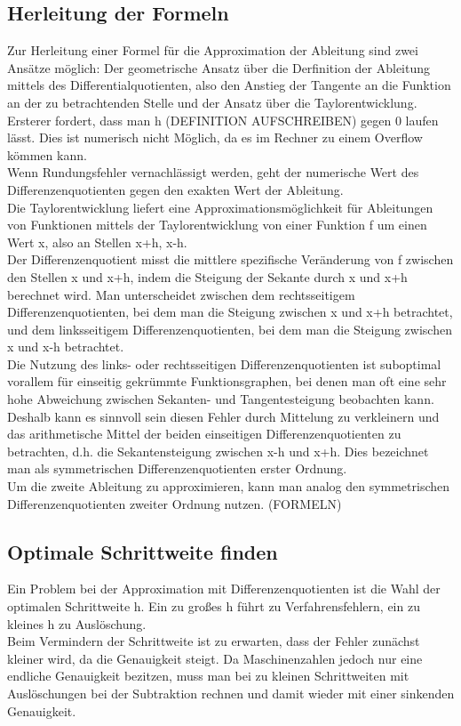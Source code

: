 \documentclass{scrartcl}
\begin{document}
\subsection{Herleitung der Formeln}
\label{ssec:herleitung}
Zur Herleitung einer Formel für die Approximation der Ableitung sind zwei Ansätze möglich: Der geometrische Ansatz über die Derfinition der Ableitung mittels des Differentialquotienten, also den Anstieg der Tangente an die Funktion an der zu betrachtenden Stelle und der Ansatz über die Taylorentwicklung. Ersterer fordert, dass man h (DEFINITION AUFSCHREIBEN) gegen 0 laufen lässt. Dies ist numerisch nicht Möglich, da es im Rechner zu einem Overflow kömmen kann.\\
Wenn Rundungsfehler vernachlässigt werden, geht der numerische Wert des Differenzenquotienten gegen den exakten Wert der Ableitung. \\
Die Taylorentwicklung liefert eine Approximationsmöglichkeit für Ableitungen von Funktionen mittels der Taylorentwicklung von einer Funktion f um einen Wert x, also an Stellen x+h, x-h.\\
Der Differenzenquotient misst die mittlere spezifische Veränderung von f zwischen den Stellen x und x+h, indem die Steigung der Sekante durch x und x+h berechnet wird. Man unterscheidet zwischen dem rechtsseitigem Differenzenquotienten, bei dem man die Steigung zwischen x und x+h betrachtet, und dem linksseitigem Differenzenquotienten, bei dem man die Steigung zwischen x und x-h betrachtet.\\
Die Nutzung des links- oder rechtsseitigen Differenzenquotienten ist suboptimal vorallem für einseitig gekrümmte Funktionsgraphen, bei denen man oft eine sehr hohe Abweichung zwischen Sekanten- und Tangentesteigung beobachten kann. Deshalb kann es sinnvoll sein diesen Fehler durch Mittelung zu verkleinern und das arithmetische Mittel der beiden einseitigen Differenzenquotienten zu betrachten, d.h. die Sekantensteigung zwischen x-h und x+h. Dies bezeichnet man als symmetrischen Differenzenquotienten erster Ordnung.\\
Um die zweite Ableitung zu approximieren, kann man analog den symmetrischen Differenzenquotienten zweiter Ordnung nutzen. (FORMELN)\\

\subsection{Optimale Schrittweite finden}
\label{ssec:schrittweite}
Ein Problem bei der Approximation mit Differenzenquotienten ist die Wahl der optimalen Schrittweite h. Ein zu großes h führt zu Verfahrensfehlern, ein zu kleines h zu Auslöschung.\\
Beim Vermindern der Schrittweite ist zu erwarten, dass der Fehler zunächst kleiner wird, da die Genauigkeit steigt. Da Maschinenzahlen jedoch nur eine endliche Genauigkeit bezitzen, muss man bei zu kleinen Schrittweiten mit Auslöschungen bei der Subtraktion rechnen und damit wieder mit einer sinkenden Genauigkeit.
\end{document}
